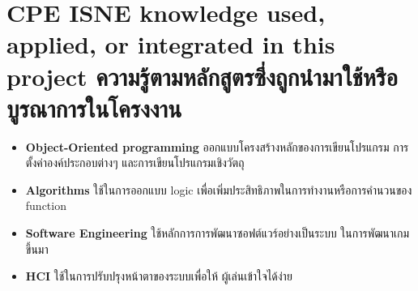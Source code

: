 





\section{\ifenglish%
    \ifcpe CPE \else ISNE \fi knowledge used, applied, or integrated in this project
  \else%
    ความรู้ตามหลักสูตรซึ่งถูกนำมาใช้หรือบูรณาการในโครงงาน
  \fi
 }

\begin{itemize}
  \item \textbf{Object-Oriented programming} ออกแบบโครงสร้างหลักของการเขียนโปรแกรม การตั้งค่าองค์ประกอบต่างๆ และการเขียนโปรแกรมเชิงวัตถุ
  \item \textbf{Algorithms} ใช้ในการออกแบบ logic เพื่อเพิ่มประสิทธิภาพในการทำงานหรือการคำนวนของ function
  \item \textbf{Software Engineering} ใช้หลักการการพัฒนาซอฟต์แวร์อย่างเป็นระบบ ในการพัฒนาเกมขึ้นมา
  \item \textbf{HCI} ใช้ในการปรับปรุงหน้าตาของระบบเพื่อให้ ผู้เล่นเข้าใจได้ง่าย
\end{itemize}

